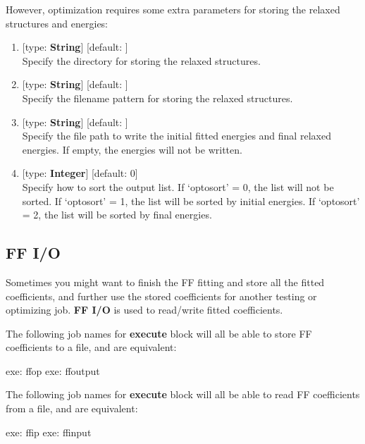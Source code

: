 \documentclass[11pt]{book}
\begin{document}
However, optimization requires some extra parameters for storing the relaxed structures and energies:

\begin{enumerate}
\item {} [type: \textbf{String}] [default: ] \\
	Specify the directory for storing the relaxed structures.
\item {} [type: \textbf{String}] [default: ] \\
	Specify the filename pattern for storing the relaxed structures.
\item {} [type: \textbf{String}] [default: ] \\
	Specify the file path to write the initial fitted energies and final relaxed energies. If empty, the energies will not be written.
\item {} [type: \textbf{Integer}] [default: 0] \\
	Specify how to sort the output list. If `optosort' = 0, the list will not be sorted. If `optosort' = 1, the list will be sorted by initial energies. 
	If `optosort' = 2, the list will be sorted by final energies.
\end{enumerate}

\subsection{FF I/O}\label{ffs}

Sometimes you might want to finish the FF fitting and store all the fitted coefficients, and further use the stored coefficients for another testing or 
optimizing job. \textbf{FF I/O} is used to read/write fitted coefficients.

The following job names for \textbf{execute} block will all be able to store FF coefficients to a file, and are equivalent:

\begin{everbatim}
{ exe: ffop }
{ exe: ffoutput }
\end{everbatim}

The following job names for \textbf{execute} block will all be able to read FF coefficients from a file, and are equivalent:

\begin{everbatim}
{ exe: ffip }
{ exe: ffinput }
\end{everbatim}
\end{document}
